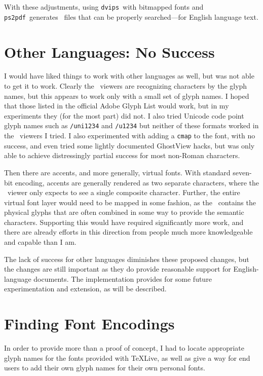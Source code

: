 \documentclass{ltugboat}
\def\PDF{\acro{PDF}}
\def\dvips{\texttt{dvips}}
\def\ps2pdf{\texttt{ps2pdf}}
\begin{document}
With these adjustments, using \dvips\ with bitmapped fonts
and \ps2pdf\ generates \PDF\ files that can be properly
searched---for English language text.

\section{Other Languages: No Success}

I would have liked things to work with other languages as
well, but was not able to get it to work.  Clearly the
\PDF\ viewers are recognizing characters by the glyph
names, but this appears to work only with a small set of
glyph names.  I hoped that those listed in the official
Adobe Glyph List would work, but in my experiments they
(for the most part) did not.  I also tried Unicode code
point glyph names such as \texttt{/uni1234} and \texttt{/u1234}
but neither of these formats worked in the \PDF\ viewers
I tried.  I also experimented with adding a \texttt{cmap}
to the font, with no success, and even tried some lightly
documented GhostView hacks, but was only able to achieve
distressingly partial success for most non-Roman characters.

Then there are accents, and more generally, virtual fonts.
With standard seven-bit encoding, accents are generally
rendered as two separate characters, where the \PDF\ viewer
only expects to see a single composite character.  Further,
the entire virtual font layer would need to be mapped in
some fashion, as the \PDF\ contains the physical glyphs
that are often combined in some way to provide the semantic
characters.  Supporting this would have required significantly
more work, and there are already efforts in this direction
from people much more knowledgeable and capable than I am.

The lack of success for other languages diminishes these
proposed changes, but the changes are still important as they
do provide reasonable support for English-language documents.
The implementation provides for some future experimentation and
extension, as will be described.

\section{Finding Font Encodings}

In order to provide more than a proof of concept, I had to
locate appropriate glyph names for the fonts provided with
\TeX Live, as well as give a way for end users to add their
own glyph names for their own personal fonts.
\end{document}
